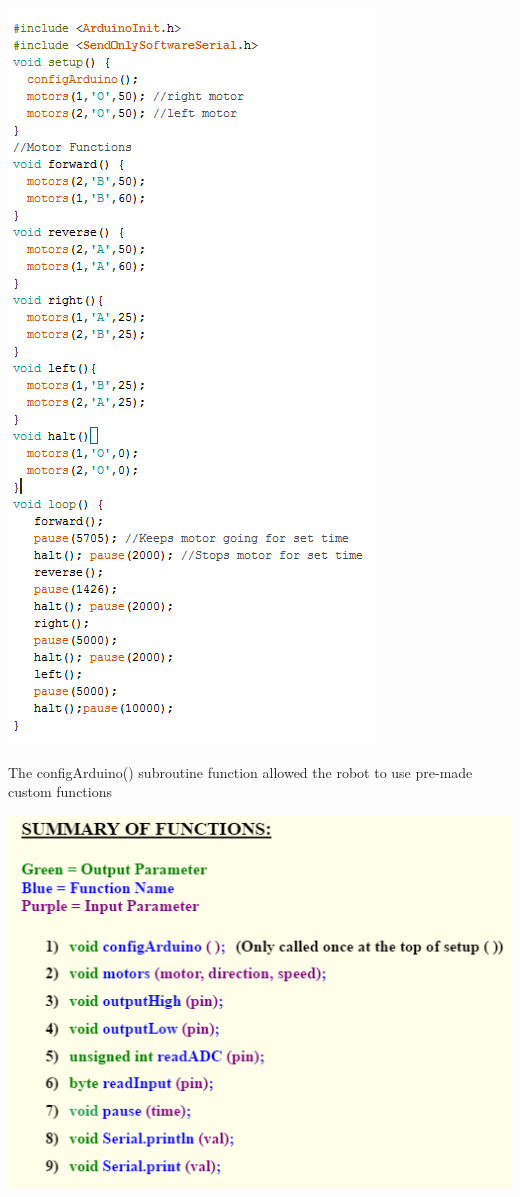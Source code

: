 \documentclass{article}
\begin{document}
    \begin{center}
    \includegraphics[]{RobotDance.png}
    \end{center}
    
    The configArduino() subroutine function allowed the robot to use pre-made custom functions \\
    
    \begin{center}
    \includegraphics[]{Subroutines.png}
    \end{center}
    
\end{document}

